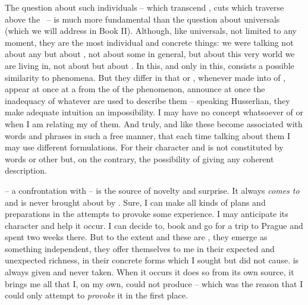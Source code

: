 The question about such individuals -- which transcend , {cuts}
which traverse  above the \hoa\ -- is much more fundamental than
the question about universals (which we will address in Book II). Although, like
universals, not
limited to any  moment, they are the most individual and concrete
things: we were talking not about 
any  but about , not about some
 in general, but about this very world we are living in, not about
 but about . In this, 
and only in this, consists a possible similarity to phenomena. But they differ
in that  or , whenever made into
 of 
, appear at once at a  from the  of
the phenomenon, announce at once the
inadequacy of whatever  are used to describe them -- speaking
Husserlian, they make adequate intuition an impossibility. 
I may have no concept whatsoever of  or  when I am relating my  of them.  And truly,
 and  like these become associated with words
and phrases in such a free manner, that each time talking about them I may use
different formulations. For their character and  is not constituted by
words or other   but, on the contrary,  the possibility of
giving any coherent description.


%
\pa
{} -- a  confrontation with  -- is
the source of novelty and surprise. It always {\em comes to}  and
is never brought about by .
Sure, I can make all kinds of plans and preparations in the attempts to provoke
some experience.  I may anticipate its character and help it occur.  I can 
decide to, book and go for a trip to Prague and spent two weeks there. But to the
extent  and these  are , they
emerge as something independent, they offer themselves to me in their expected
and unexpected richness, in their concrete forms which I sought but did not
cause.   is always given and never taken.  When it occurs it
does so from its own source, it brings me all that I, on my own, could not
produce -- which was the reason that I could only attempt to {\em provoke} it in the
first place.

